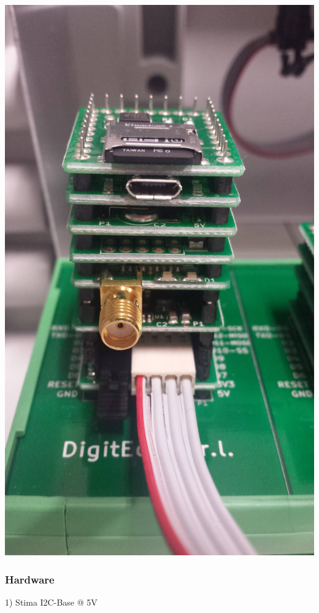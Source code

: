 \begin{DoxyImageNoCaption}
  \mbox{\includegraphics[width=\textwidth,height=\textheight/2,keepaspectratio=true]{gsm.jpg}}
\end{DoxyImageNoCaption}
\hypertarget{index_stima_gsm_hardware}{}\subsubsection{Hardware}\label{index_stima_gsm_hardware}
1) Stima I2\+C-\/\+Base @ 5V

